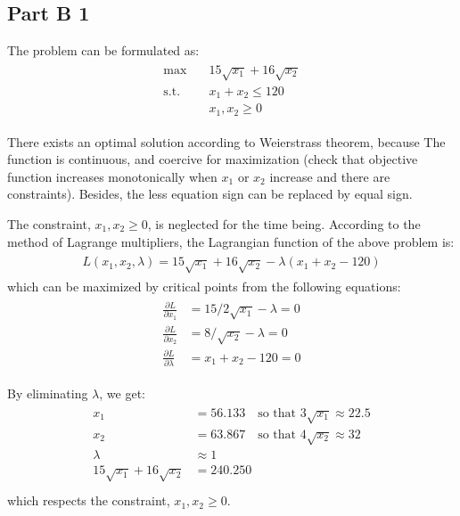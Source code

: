 \documentclass[fleqn,10pt]{wlscirep}
\begin{document}
\subsection{Part B 1}

The problem can be formulated as:
\begin{align} \begin{split}
    \max \quad & 15 \sqrt{x_{1}} + 16 \sqrt{x_{2}} \\
    \text{s.t.} \quad & x_{1} + x_{2} \leq 120 \\
    & x_{1}, x_{2} \geq 0
\end{split} \end{align} 

There exists an optimal solution according to Weierstrass theorem, because The function is continuous, and coercive for maximization (check that objective function increases monotonically when $x_{1}$ or $x_{2}$ increase and there are constraints). Besides, the less equation sign can be replaced by equal sign.

The constraint, $x_{1}, x_{2} \geq 0$, is neglected for the time being. According to the method of Lagrange multipliers, the Lagrangian function of the above problem is:
\begin{align} \begin{split}
    L(x_{1}, x_{2}, \lambda) = 15 \sqrt{x_{1}} + 16 \sqrt{x_{2}} - \lambda (x_{1} + x_{2} - 120)
\end{split} \end{align} 
which can be maximized by critical points from the following equations:
\begin{align} \begin{split}
    \frac{\partial L}{\partial x_{1}} &= 15 / 2 \sqrt{x_{1}} - \lambda = 0 \\
    \frac{\partial L}{\partial x_{2}} &= 8 / \sqrt{x_{2}} - \lambda = 0 \\
    \frac{\partial L}{\partial \lambda} &= x_{1} + x_{2} - 120 = 0
\end{split} \end{align} 

By eliminating $\lambda$, we get:
\begin{align} \begin{split}
    x_{1} &= 56.133 \quad \text{so that  } 3 \sqrt{x_{1}} \approx 22.5 \\
    x_{2} &= 63.867 \quad \text{so that  } 4 \sqrt{x_{2}} \approx 32 \\
    \lambda &\approx 1 \\
    15 \sqrt{x_{1}} + 16 \sqrt{x_{2}} &= 240.250 \\
\end{split} \end{align} 
which respects the constraint, $x_{1}, x_{2} \geq 0$.
\end{document}
